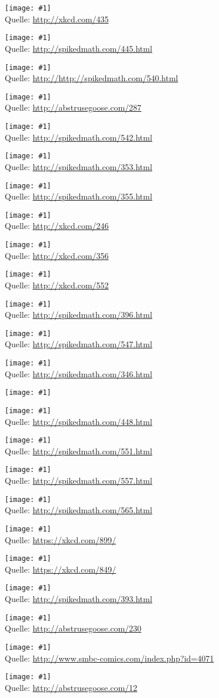 \documentclass[a4paper,ngerman,landscape]{scrartcl}
\newcommand{\comic}[3]{\begin{center}
  \texttt{[image: \#1]} \\[2em]

  Quelle: \url{#2}
\end{center}\newpage}
\newcommand{\comicW}[2]{\begin{center}
  \texttt{[image: \#1]} \\[2em]

  Quelle: \url{#2}
\end{center}\newpage}
\newcommand{\comicH}[2]{\begin{center}
  \texttt{[image: \#1]} \\[2em]

  Quelle: \url{#2}
\end{center}\newpage}
\newcommand{\comicQ}[2]{\begin{center}
  \texttt{[image: \#1]}
\end{center}\newpage}
\begin{document}
\comic{purity.png}{http://xkcd.com/435}{0.8}
\comic{three-logicians.png}{http://spikedmath.com/445.html}{1.4}
\comic{540-adventures-of-martin.png}{http://http://spikedmath.com/540.html}{1.4}
\comic{this_is_what_my_room_looks_like_when_i_draw}{http://abstrusegoose.com/287}{0.4}
\comic{542-science-vs-math}{http://spikedmath.com/542.html}{1.4}
\comic{353-fortune-teller-1}{http://spikedmath.com/353.html}{1.4}
\comic{355-fortune-teller-3}{http://spikedmath.com/355.html}{1.4}
\comic{labyrinth_puzzle}{http://xkcd.com/246}{2.7}
\comic{nerd_sniping}{http://xkcd.com/356}{0.8}
\comic{correlation}{http://xkcd.com/552}{1.6}
\comic{homer}{http://spikedmath.com/396.html}{2.4}
\comic{547-the-perfect-score}{http://spikedmath.com/547.html}{1.3}
\comic{346-cookies}{http://spikedmath.com/346.html}{1.3}
\comicQ{boromir-gauss}{1.3}
\comicH{448-online-dating}{http://spikedmath.com/448.html}
\comicW{comic-autological}{http://spikedmath.com/551.html}
\comicW{557-Proofs-Part-1}{http://spikedmath.com/557.html}
\comicW{565-sine-and-cosine}{http://spikedmath.com/565.html}
\comicW{number_line}{https://xkcd.com/899/}
\comicW{complex_conjugate}{https://xkcd.com/849/}
\comicH{393-mathgasm}{http://spikedmath.com/393.html}
\comicW{it_is_obvious}{http://abstrusegoose.com/230}
\comicH{smbc-chessboard}{http://www.smbc-comics.com/index.php?id=4071}
\comicW{math_text}{http://abstrusegoose.com/12}
\end{document}
